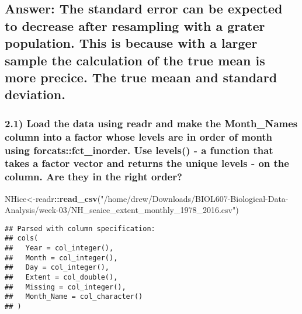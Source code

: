 \documentclass[]{article}
\newenvironment{Shaded}{\begin{snugshade}}{\end{snugshade}}
\newcommand{\KeywordTok}[1]{\textcolor[rgb]{0.13,0.29,0.53}{\textbf{#1}}}
\newcommand{\DataTypeTok}[1]{\textcolor[rgb]{0.13,0.29,0.53}{#1}}
\newcommand{\StringTok}[1]{\textcolor[rgb]{0.31,0.60,0.02}{#1}}
\newcommand{\OtherTok}[1]{\textcolor[rgb]{0.56,0.35,0.01}{#1}}
\newcommand{\OperatorTok}[1]{\textcolor[rgb]{0.81,0.36,0.00}{\textbf{#1}}}
\newcommand{\NormalTok}[1]{#1}
\begin{document}
\subsection{Answer: The standard error can be expected to decrease after
resampling with a grater population. This is because with a larger
sample the calculation of the true mean is more precice. The true meaan
and standard
deviation.}\label{answer-the-standard-error-can-be-expected-to-decrease-after-resampling-with-a-grater-population.-this-is-because-with-a-larger-sample-the-calculation-of-the-true-mean-is-more-precice.-the-true-meaan-and-standard-deviation.}

\subsubsection{2.1) Load the data using readr and make the Month\_Names
column into a factor whose levels are in order of month using
forcats::fct\_inorder. Use levels() - a function that takes a factor
vector and returns the unique levels - on the column. Are they in the
right
order?}\label{load-the-data-using-readr-and-make-the-month_names-column-into-a-factor-whose-levels-are-in-order-of-month-using-forcatsfct_inorder.-use-levels---a-function-that-takes-a-factor-vector-and-returns-the-unique-levels---on-the-column.-are-they-in-the-right-order}

\begin{Shaded}
\begin{Highlighting}[]
\NormalTok{NHice<-readr}\OperatorTok{::}\KeywordTok{read_csv}\NormalTok{(}\StringTok{"/home/drew/Downloads/BIOL607-Biological-Data-Analysis/week-03/NH_seaice_extent_monthly_1978_2016.csv"}\NormalTok{)}
\end{Highlighting}
\end{Shaded}

\begin{verbatim}
## Parsed with column specification:
## cols(
##   Year = col_integer(),
##   Month = col_integer(),
##   Day = col_integer(),
##   Extent = col_double(),
##   Missing = col_integer(),
##   Month_Name = col_character()
## )
\end{verbatim}

\begin{Shaded}
\end{Shaded}
\end{document}
